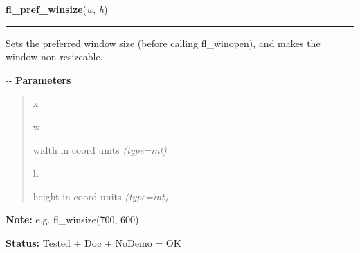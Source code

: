 \hspace{.8\funcindent}\begin{boxedminipage}{\funcwidth}

    \raggedright \textbf{fl\_pref\_winsize}(\textit{w}, \textit{h})

    \vspace{-1.5ex}

    \rule{\textwidth}{0.5\fboxrule}
\setlength{\parskip}{2ex}

Sets the preferred window size (before calling fl\_winopen), and
makes the window non-resizeable.

-{}-
\setlength{\parskip}{1ex}
      \textbf{Parameters}
      \vspace{-1ex}

      \begin{quote}
        \begin{Ventry}{x}

          \item[w]


width in coord units
            {\it (type=int)}

          \item[h]


height in coord units
            {\it (type=int)}

        \end{Ventry}

      \end{quote}

\textbf{Note:} 
e.g. fl\_winsize(700, 600)


\textbf{Status:} 
Tested + Doc + NoDemo = OK


    \end{boxedminipage}

    \label{xformslib:flxbasic:fl_initial_winsize}

    \vspace{0.5ex}

